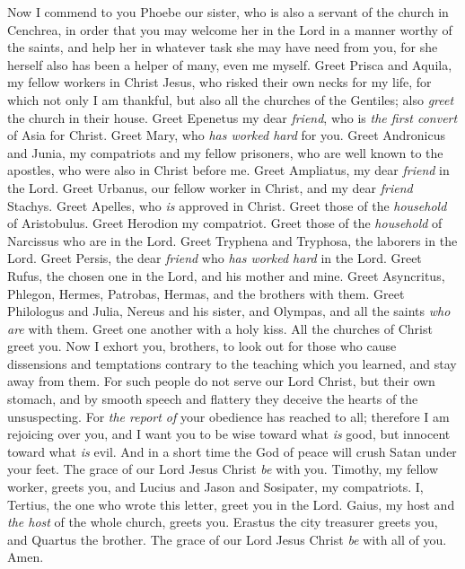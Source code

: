 \begin{biblechapter} %
 Now I commend to you Phoebe our sister, who is also a servant of the church in Cenchrea,
\verse in order that you may welcome her in the Lord in a manner worthy of the saints, and help her in whatever task she may have need from you, for she herself also has been a helper of many, even me myself.
\verse Greet Prisca and Aquila, my fellow workers in Christ Jesus,
\verse who risked their own necks for my life, for which not only I am thankful, but also all the churches of the Gentiles;
\verse also \textit{greet} the church in their house. Greet Epenetus my dear \textit{friend}, who is \textit{the first convert} of Asia for Christ.
\verse Greet Mary, who \textit{has worked hard} for you.
\verse Greet Andronicus and Junia, my compatriots and my fellow prisoners, who are well known to the apostles, who were also in Christ before me.
\verse Greet Ampliatus, my dear \textit{friend} in the Lord.
\verse Greet Urbanus, our fellow worker in Christ, and my dear \textit{friend} Stachys.
\verse Greet Apelles, who \textit{is} approved in Christ. Greet those of the \textit{household} of Aristobulus.
\verse Greet Herodion my compatriot. Greet those of the \textit{household} of Narcissus who are in the Lord.
\verse Greet Tryphena and Tryphosa, the laborers in the Lord. Greet Persis, the dear \textit{friend} who \textit{has worked hard} in the Lord.
\verse Greet Rufus, the chosen one in the Lord, and his mother and mine.
\verse Greet Asyncritus, Phlegon, Hermes, Patrobas, Hermas, and the brothers with them.
\verse Greet Philologus and Julia, Nereus and his sister, and Olympas, and all the saints \textit{who are} with them.
\verse Greet one another with a holy kiss. All the churches of Christ greet you.
 Now I exhort you, brothers, to look out for those who cause dissensions and temptations contrary to the teaching which you learned, and stay away from them.
\verse For such people do not serve our Lord Christ, but their own stomach, and by smooth speech and flattery they deceive the hearts of the unsuspecting.
\verse For \textit{the report of} your obedience has reached to all; therefore I am rejoicing over you, and I want you to be wise toward what \textit{is} good, but innocent toward what \textit{is} evil.
\verse And in a short time the God of peace will crush Satan under your feet. The grace of our Lord Jesus Christ \textit{be} with you.
 Timothy, my fellow worker, greets you, and Lucius and Jason and Sosipater, my compatriots.
\verse I, Tertius, the one who wrote this letter, greet you in the Lord.
\verse Gaius, my host and \textit{the host} of the whole church, greets you. Erastus the city treasurer greets you, and Quartus the brother.
 The grace of our Lord Jesus Christ \textit{be} with all of you. Amen.
\end{biblechapter}

